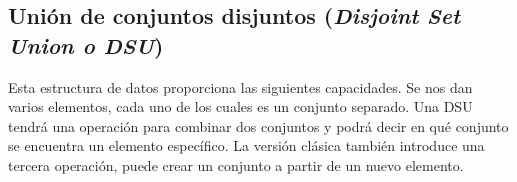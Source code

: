 \subsection{Unión de conjuntos disjuntos (\emph{Disjoint Set Union o DSU})}

Esta estructura de datos proporciona las siguientes capacidades. Se nos dan varios elementos, cada uno de los cuales es un conjunto separado. Una DSU tendrá una operación para combinar dos conjuntos y podrá decir en qué conjunto se encuentra un elemento específico. La versión clásica también introduce una tercera operación, puede crear un conjunto a partir de un nuevo elemento.
